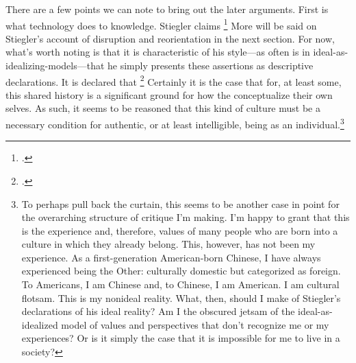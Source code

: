 \documentclass[letterpaper,notitlepage,12pt]{article}
\begin{document}
There are a few points we can note to bring out the later arguments.
First is what technology does to knowledge.
Stiegler claims \footcite[ch.
2.8]{stiegler_age_2019}
More will be said on Stiegler's account of disruption and reorientation in the
next section.
For now, what's worth noting is that it is characteristic of his style---as often
is in ideal-as-idealizing-models---that he simply presents these assertions as
descriptive declarations.
It is declared that \footcite[ch.
2.7]{stiegler_age_2019}
Certainly it is the case that for, at least some, this shared history is a
significant ground for how the conceptualize their own selves.
As such, it seems to be reasoned that this kind of culture must be a necessary
condition for authentic, or at least intelligible, being as an
individual.\footnote{To perhaps pull back the curtain, this seems to be another
  case in point for the overarching structure of critique I'm making. I'm happy
  to grant that this is the experience and, therefore, values of many people who
  are born into a culture in which they already belong. This, however, has not
  been my experience. As a first-generation American-born Chinese, I have always
  experienced being the Other: culturally domestic but categorized as foreign.
  To Americans, I am Chinese and, to Chinese, I am American. I am cultural
  flotsam. This is my nonideal reality. What, then, should I make of Stiegler's
  declarations of his ideal reality? Am I the obscured jetsam of the
  ideal-as-idealized model of values and perspectives that don't recognize me or
  my experiences? Or is it simply the case that it is impossible for me to live
in a society?}
\end{document}
